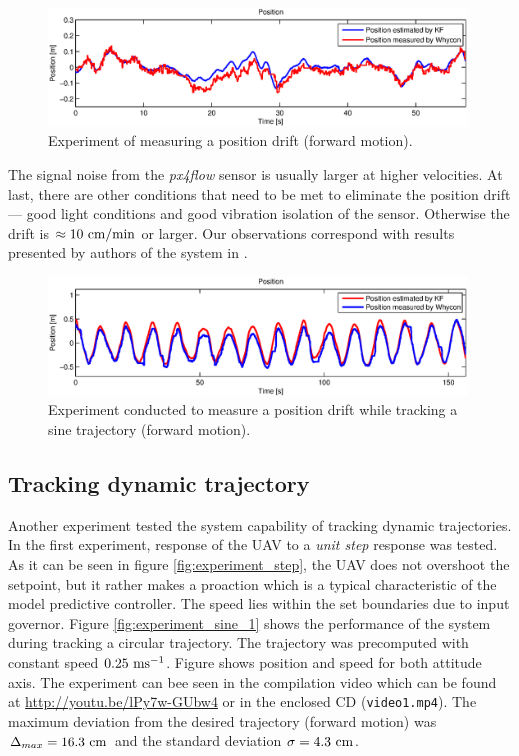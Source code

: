 \begin{figure}[H]
\centering
\includegraphics[width=0.99\textwidth]{fig/experiment5_drift_constant.eps}
\caption{Experiment of measuring a position drift (forward motion).}
\label{fig:experiment_drift_constant}
\end{figure}

The signal noise from the \emph{px4flow} sensor is usually larger at higher velocities. At last, there are other conditions that need to be met to eliminate the position drift --- good light conditions and good vibration isolation of the sensor. Otherwise the drift is $\approx 10~\mathrm{cm/min}$ or larger. Our observations correspond with results presented by authors of the system in \citep{honegger2013open}.

\begin{figure}[H]
\centering
\includegraphics[width=0.99\textwidth]{fig/experiment5_drift_sine.eps}
\caption{Experiment conducted to measure a position drift while tracking a sine trajectory (forward motion).}
\label{fig:experiment_drift_sine}
\end{figure}

\subsection{Tracking dynamic trajectory}
\label{cap:dynamic_trajectory_tracking}

Another experiment tested the system capability of tracking dynamic trajectories. In the first experiment, response of the UAV to a \emph{unit step} response was tested. As it can be seen in figure \ref{fig:experiment_step}, the UAV does not overshoot the setpoint, but it rather makes a proaction which is a typical characteristic of the model predictive controller. The speed lies within the set boundaries due to input governor. Figure \ref{fig:experiment_sine_1} shows the performance of the system during tracking a circular trajectory. The trajectory was precomputed with constant speed $0.25~\mathrm{ms^{-1}}$. Figure shows position and speed for both attitude axis. The experiment can bee seen in the compilation video which can be found at \url{http://youtu.be/lPy7w-GUbw4} or in the enclosed CD (\texttt{video1.mp4}). The maximum deviation from the desired trajectory (forward motion) was $\Delta_{max} = 16.3~\mathrm{cm}$ and the standard deviation $\sigma = 4.3~\mathrm{cm}$.

